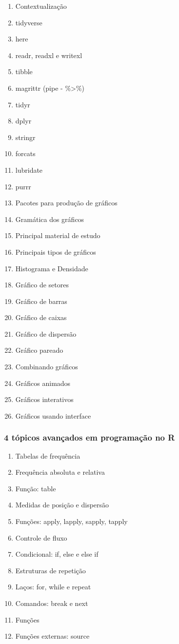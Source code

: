 \documentclass[
  letterpaper,
  DIV=11,
  numbers=noendperiod]{scrartcl}
\providecommand{\tightlist}{%
  \setlength{\itemsep}{0pt}\setlength{\parskip}{0pt}}\usepackage{longtable,booktabs,array}
\begin{document}
\begin{enumerate}
\def\labelenumi{\arabic{enumi}.}
\tightlist
\item
  Contextualização
\item
  tidyverse
\item
  here
\item
  readr, readxl e writexl
\item
  tibble
\item
  magrittr (pipe - \%\textgreater\%)
\item
  tidyr
\item
  dplyr
\item
  stringr
\item
  forcats
\item
  lubridate
\item
  purrr
\item
  Pacotes para produção de gráficos
\item
  Gramática dos gráficos
\item
  Principal material de estudo
\item
  Principais tipos de gráficos
\item
  Histograma e Densidade
\item
  Gráfico de setores
\item
  Gráfico de barras
\item
  Gráfico de caixas
\item
  Gráfico de dispersão
\item
  Gráfico pareado
\item
  Combinando gráficos
\item
  Gráficos animados
\item
  Gráficos interativos
\item
  Gráficos usando interface
\end{enumerate}

\subsubsection{4 tópicos avançados em programação no
R}\label{tuxf3picos-avanuxe7ados-em-programauxe7uxe3o-no-r}

\begin{enumerate}
\def\labelenumi{\arabic{enumi}.}
\tightlist
\item
  Tabelas de frequência
\item
  Frequência absoluta e relativa
\item
  Função: table
\item
  Medidas de posição e dispersão
\item
  Funções: apply, lapply, sapply, tapply
\item
  Controle de fluxo
\item
  Condicional: if, else e else if
\item
  Estruturas de repetição
\item
  Laços: for, while e repeat
\item
  Comandos: break e next
\item
  Funções
\item
  Funções externas: source
\end{enumerate}
\end{document}
